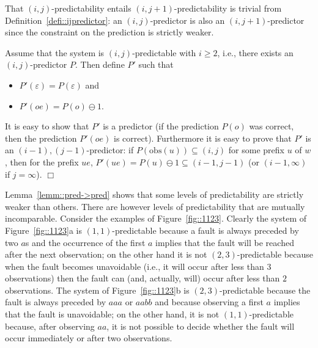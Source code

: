 \documentclass{article}
\newenvironment{proof}{\par\noindent{\bf Proof}}{\hspace{\stretch{1}}$\Box$}
\newcommand{\obs}[0]{\mathrm{obs}}
\begin{document}
\begin{proof}
  That $(i,j)$-predictability entails $(i,j+1)$-predictability 
  is trivial from Definition~\ref{defi::ijpredictor}: 
  an $(i,j)$-predictor is also an $(i,j+1)$-predictor 
  since the constraint on the prediction is strictly weaker.  

  Assume that the system is $(i,j)$-predictable with $i \ge 2$, 
  i.e., there exists an $(i,j)$-predictor $P$.  
  Then define $P'$ such that 
  \begin{itemize}
  \item $P'(\varepsilon) = P(\varepsilon)$ and 
  \item $P'(oe) = P(o) \ominus 1$.  
  \end{itemize}  
  It is easy to show that $P'$ is a predictor 
  (if the prediction $P(o)$ was correct, 
  then the prediction $P'(oe)$ is correct).  
  Furthermore it is easy to prove that $P'$ is an $(i-1),(j-1)$-predictor: 
  if $P(\obs(u)) \subseteq (i,j)$ for some prefix $u$ of $w$, 
  then for the prefix $ue$, 
  $P'(ue) = P(u) \ominus 1 \subseteq (i-1,j-1)$ 
  (or $(i-1,\infty)$ if $j = \infty$).  
\end{proof}

Lemma~\ref{lemm::pred->pred} shows that some levels of predictability 
are strictly weaker than others.  
There are however levels of predictability 
that are mutually incomparable.  
Consider the examples of Figure~\ref{fig::1123}.  
Clearly the system of Figure~\ref{fig::1123}a is $(1,1)$-predictable 
because a fault is always preceded by two $a$s 
and the occurrence of the first $a$ implies 
that the fault will be reached after the next observation; 
on the other hand it is not $(2,3)$-predictable 
because when the fault becomes unavoidable 
(i.e., it will occur after less than $3$ observations) 
then the fault can (and, actually, will) occur after less than $2$ observations.  
The system of Figure~\ref{fig::1123}b is $(2,3)$-predictable 
because the fault is always preceded by $aaa$ or $aabb$ 
and because observing a first $a$ implies that the fault is unavoidable; 
on the other hand, it is not $(1,1)$-predictable 
because, after observing $aa$, it is not possible to decide 
whether the fault will occur immediately or after two observations.  
\end{document}
